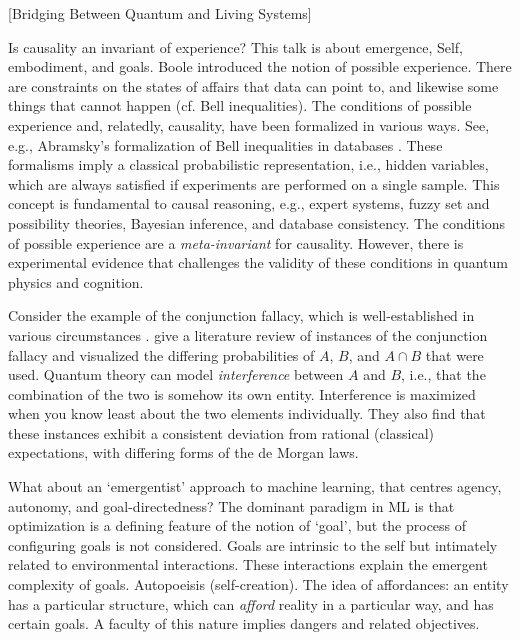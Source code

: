 [Bridging Between Quantum and Living Systems]

\begin{affils}
\end{affils}

Is causality an invariant of experience?
This talk is about emergence, Self, embodiment, and goals.
Boole introduced the notion of possible experience.
There are constraints on the states of affairs that data can point to, and likewise
some things that cannot happen (cf.
Bell inequalities).
The conditions of possible experience and, relatedly, causality, have been formalized
in various ways.
See, e.g., Abramsky's formalization of Bell inequalities in databases
\parencite*{Abramsky2013}.
These formalisms imply a classical probabilistic representation, i.e., hidden
variables, which are always satisfied if experiments are performed on a single sample.
This concept is fundamental to causal reasoning, e.g., expert systems, fuzzy set and
possibility theories, Bayesian inference, and database consistency.
The conditions of possible experience are a \emph{meta-invariant} for causality.
However, there is experimental evidence that challenges the validity of these
conditions in quantum physics and cognition.

Consider the example of the conjunction fallacy, which is well-established in various
circumstances \parencites{Kahneman1972}.
\textcites{Veloz2023} give a literature review of instances of the conjunction fallacy and
visualized the differing probabilities of $A$, $B$, and $A \cap B$ that were used.
Quantum theory can model \emph{interference} between $A$ and $B$, i.e., that the
combination of the two is somehow its own entity.
Interference is maximized when you know least about the two elements individually.
They also find that these instances exhibit a consistent deviation from rational
(classical) expectations, with differing forms of the de Morgan laws.

What about an `emergentist' approach to machine learning, that centres agency,
autonomy, and goal-directedness?
The dominant paradigm in ML is that optimization is a defining feature of the notion of
`goal', but the process of configuring goals is not considered.
Goals are intrinsic to the self but intimately related to environmental interactions.
These interactions explain the emergent complexity of goals.
Autopoeisis (self-creation).
The idea of affordances: an entity has a particular structure, which can \emph{afford}
reality in a particular way, and has certain goals.
A faculty of this nature implies dangers and related objectives.

